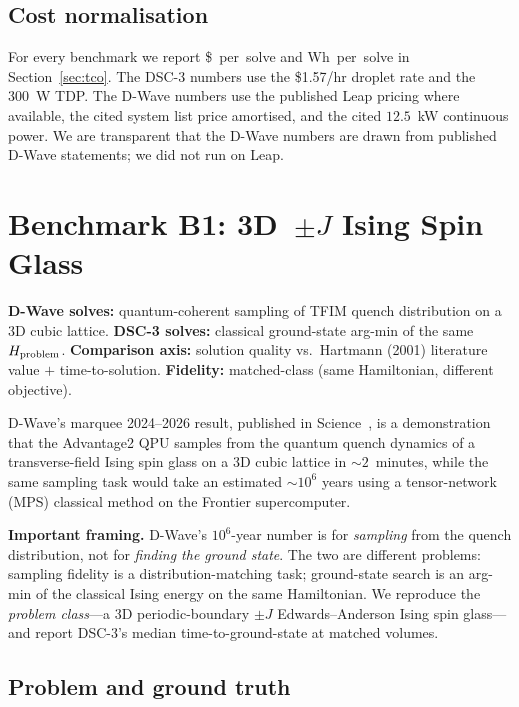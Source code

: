 \documentclass[11pt,a4paper]{article}
\begin{document}
\subsection{Cost normalisation}

For every benchmark we report \$~per~solve and Wh~per~solve in
Section~\ref{sec:tco}. The DSC-3 numbers use the \$1.57/hr droplet rate
and the 300~W TDP. The D-Wave numbers use the published Leap pricing
where available, the cited system list price amortised, and the cited
$12.5$~kW continuous power. We are transparent that the D-Wave numbers
are drawn from published D-Wave statements; we did not run on Leap.

\section{Benchmark B1: 3D~$\pm J$ Ising Spin Glass}
\label{sec:b1}

\textbf{D-Wave solves:} quantum-coherent sampling of TFIM quench
distribution on a 3D cubic lattice.
\textbf{DSC-3 solves:} classical ground-state arg-min of the same
$H_{\rm problem}$.
\textbf{Comparison axis:} solution quality vs.\ Hartmann (2001)
literature value $+$ time-to-solution.
\textbf{Fidelity:} matched-class (same Hamiltonian, different
objective).

D-Wave's marquee 2024--2026 result, published in Science~\cite{king_beyond_classical_2025},
is a demonstration that the Advantage2 QPU samples from the quantum quench
dynamics of a transverse-field Ising spin glass on a 3D cubic lattice in
$\sim\!2$~minutes, while the same sampling task would take an estimated
$\sim\!10^{6}$ years using a tensor-network (MPS) classical method on the
Frontier supercomputer.

\textbf{Important framing.} D-Wave's $10^{6}$-year number is for
\emph{sampling} from the quench distribution, not for \emph{finding the
ground state}. The two are different problems: sampling fidelity is a
distribution-matching task; ground-state search is an arg-min of the
classical Ising energy on the same Hamiltonian. We reproduce the
\emph{problem class}---a 3D periodic-boundary $\pm J$ Edwards--Anderson
Ising spin glass---and report DSC-3's median time-to-ground-state at
matched volumes.

\subsection{Problem and ground truth}
\end{document}
